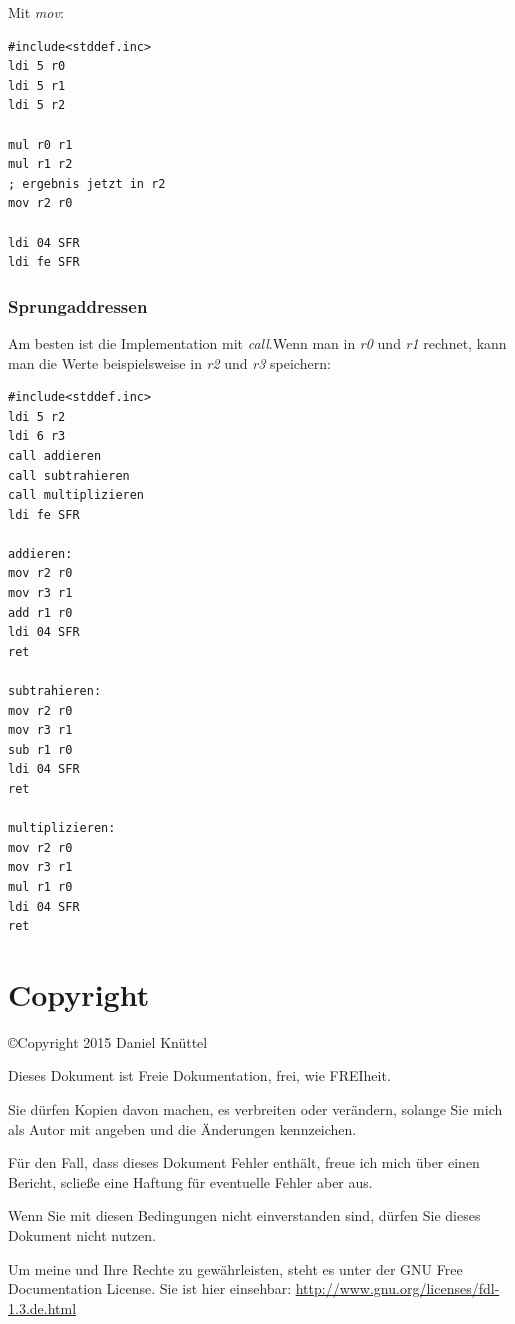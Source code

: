 \documentclass[a4paper,12pt,oneside]{scrreprt}
\begin{document}
Mit \textit{mov}:

\begin{lstlisting}[frame=single]
#include<stddef.inc>
ldi 5 r0
ldi 5 r1
ldi 5 r2

mul r0 r1
mul r1 r2
; ergebnis jetzt in r2
mov r2 r0

ldi 04 SFR
ldi fe SFR
\end{lstlisting}

\section{Sprungaddressen}

Am besten ist die Implementation mit \textit{call}.Wenn man in \textit{r0} und \textit{r1} rechnet, kann man die Werte beispielsweise in \textit{r2} und \textit{r3} speichern:

\begin{lstlisting}[frame=single]
#include<stddef.inc>
ldi 5 r2
ldi 6 r3
call addieren
call subtrahieren
call multiplizieren
ldi fe SFR

addieren:
mov r2 r0
mov r3 r1
add r1 r0
ldi 04 SFR
ret

subtrahieren:
mov r2 r0
mov r3 r1
sub r1 r0
ldi 04 SFR
ret

multiplizieren:
mov r2 r0
mov r3 r1
mul r1 r0
ldi 04 SFR
ret
\end{lstlisting}

\part{Copyright}

\copyright Copyright 2015 Daniel Knüttel

Dieses Dokument ist Freie Dokumentation, frei, wie FREIheit.

Sie dürfen Kopien davon machen, es verbreiten oder verändern, solange Sie mich als Autor mit angeben und die Änderungen kennzeichen.

Für den Fall, dass dieses Dokument Fehler enthält, freue ich mich über einen Bericht, scließe eine Haftung für eventuelle Fehler aber aus.

Wenn Sie mit diesen Bedingungen nicht einverstanden sind, dürfen Sie dieses Dokument nicht nutzen.

Um meine und Ihre Rechte zu gewährleisten, steht es unter der GNU Free Documentation License. Sie ist hier einsehbar: \url{http://www.gnu.org/licenses/fdl-1.3.de.html}
\end{document}
